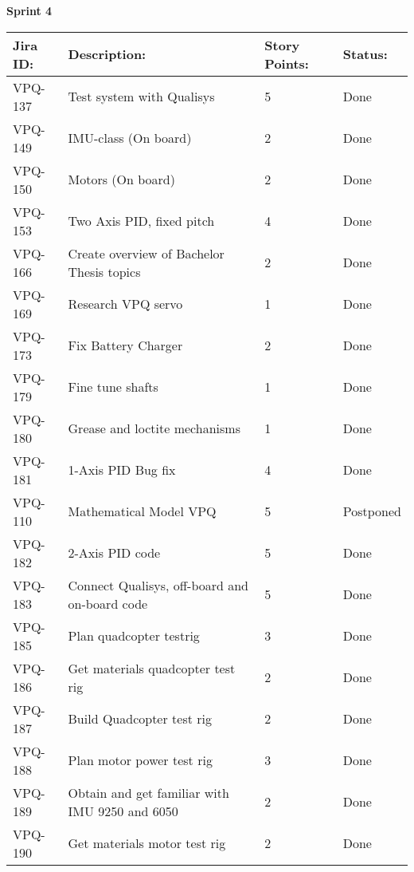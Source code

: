 \begin{table}[ht]
\centering\textbf{Sprint 4}
\begin{tabularx}{\linewidth}{|m{1.5cm} m{8.3cm} m{1.5cm} m{3.5cm}|}
\hline
    \rowcolor{cadetgrey} 
     \textbf{Jira ID:} & \textbf{Description:} &  \textbf{Story Points:} & \textbf{Status: } \\ \hline
      VPQ-137 & Test system with Qualisys & 5\centering & Done  \\ 
\rowcolor{gainsboro} VPQ-149 & IMU-class (On board) & 2\centering & Done  \\
      VPQ-150 & Motors (On board) & 2\centering & Done  \\
\rowcolor{gainsboro} VPQ-153 & Two Axis PID, fixed pitch & 4\centering & Done  \\
      VPQ-166 & Create overview of Bachelor Thesis topics & 2\centering & Done  \\
\rowcolor{gainsboro} VPQ-169 &  Research VPQ servo & 1\centering & Done  \\
      VPQ-173 & Fix Battery Charger & 2\centering & Done  \\
\rowcolor{gainsboro} VPQ-179 & Fine tune shafts & 1\centering & Done  \\    
      VPQ-180 & Grease and loctite mechanisms & 1\centering & Done  \\
\rowcolor{gainsboro}  VPQ-181 & 1-Axis PID Bug fix & 4\centering & Done  \\
      VPQ-110 & Mathematical Model VPQ & 5\centering & Postponed  \\
\rowcolor{gainsboro} VPQ-182 & 2-Axis PID code & 5\centering & Done  \\
      VPQ-183 & Connect Qualisys, off-board and on-board code & 5\centering & Done  \\
\rowcolor{gainsboro} VPQ-185 & Plan quadcopter testrig & 3\centering & Done  \\    
      VPQ-186 & Get materials quadcopter test rig & 2\centering & Done  \\
\rowcolor{gainsboro}  VPQ-187 & Build Quadcopter test rig & 2\centering & Done  \\
      VPQ-188 & Plan motor power test rig & 3\centering & Done  \\
\rowcolor{gainsboro} VPQ-189 &  Obtain and get familiar with IMU 9250 and 6050 & 2\centering & Done  \\
      VPQ-190 & Get materials motor test rig & 2\centering & Done  \\

\end{tabularx}
\end{table}

